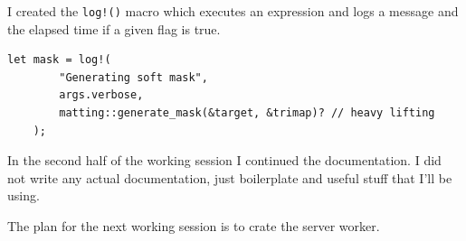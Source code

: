 \documentclass{article}
\begin{document}
I created the \lstinline[style=Rust]{log!()} macro which executes
an expression and logs a message and the elapsed time if a given flag is true.

\begin{lstlisting}[style=Rust, style=boxed]
    let mask = log!(
        "Generating soft mask",
        args.verbose,
        matting::generate_mask(&target, &trimap)? // heavy lifting
    );
\end{lstlisting}

In the second half of the working session I continued the documentation.
I did not write any actual documentation, just boilerplate and useful stuff that I'll be using.

The plan for the next working session is to crate the server worker.
\end{document}
